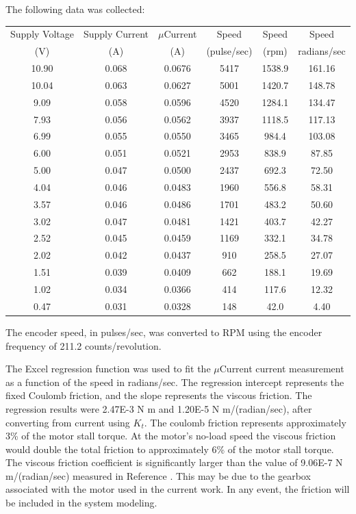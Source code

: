\documentclass[12pt,letterpaper]{article}
\begin{document}
\begin{appendices}
The following data was collected:

\begin{tabular}{|c|c|c|c|c|c|}
Supply Voltage & Supply Current & $\mu$Current & Speed & Speed & Speed\\
(V) & (A) & (A) & (pulse/sec) & (rpm) & radians/sec\\
\hline
10.90 & 0.068 & 0.0676 & 5417 & 1538.9 & 161.16\\
10.04 & 0.063 & 0.0627 & 5001 & 1420.7 & 148.78\\
9.09 & 0.058 & 0.0596 & 4520 & 1284.1 & 134.47\\
7.93 & 0.056 & 0.0562 & 3937 & 1118.5 & 117.13\\
6.99 & 0.055 & 0.0550 & 3465 & 984.4 & 103.08\\
6.00 & 0.051 & 0.0521 & 2953 & 838.9 & 87.85\\
5.00 & 0.047 & 0.0500 & 2437 & 692.3 & 72.50\\
4.04 & 0.046 & 0.0483 & 1960 & 556.8 & 58.31\\
3.57 & 0.046 & 0.0486 & 1701 & 483.2 & 50.60\\
3.02 & 0.047 & 0.0481 & 1421 & 403.7 & 42.27\\
2.52 & 0.045 & 0.0459 & 1169 & 332.1 & 34.78\\
2.02 & 0.042 & 0.0437 & 910 & 258.5 & 27.07\\
1.51 & 0.039 & 0.0409 & 662 & 188.1 & 19.69\\
1.02 & 0.034 & 0.0366 & 414 & 117.6 & 12.32\\
0.47 & 0.031 & 0.0328 & 148 & 42.0 & 4.40\\
\end{tabular}

The encoder speed, in pulses/sec, was converted to RPM using the encoder frequency of 211.2
counts/revolution.

The Excel regression function was used to fit the $\mu$Current current measurement as a function
of the speed in radians/sec.  The regression intercept represents the fixed Coulomb friction, and the
slope represents the viscous friction.  The regression results were 2.47E-3 N m and 1.20E-5 N m/(radian/sec),
after converting from current using $K_{t}$.  The coulomb friction represents approximately 3\% of the 
motor stall torque.  At the motor's no-load speed the viscous friction would double the total friction to 
approximately 6\% of the motor stall torque.  The viscous friction coefficient is significantly larger than
the value of 9.06E-7 N m/(radian/sec) measured in Reference \cite{twoWheeled}.  This may be due to
the gearbox associated with the motor used in the current work.  In any event, the friction will be included
in the system modeling.



\end{appendices}
\end{document}
